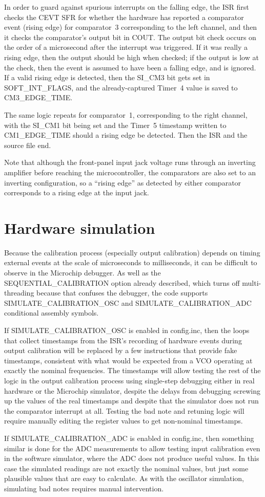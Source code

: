 In order to guard against spurious interrupts on the falling edge, the ISR
first checks the CEVT SFR for whether the hardware has reported a comparator
event (rising edge) for comparator~3 corresponding to the left channel, and
then it checks the comparator's output bit in COUT.  The output bit
check occurs on the order of a microsecond after the interrupt was
triggered.  If it was really a rising edge, then the output should be high
when checked; if the output is low at the check, then the event is assumed
to have been a falling edge, and is ignored.  If a valid rising edge is
detected, then the SI\_CM3 bit gets set in SOFT\_INT\_FLAGS, and the
already-captured Timer~4 value is saved to CM3\_EDGE\_TIME.

The same logic repeats for comparator~1, corresponding to the right channel,
with the SI\_CM1 bit being set and the Timer~5 timestamp written to
CM1\_EDGE\_TIME should a rising edge be detected.  Then the ISR and the
source file end.

Note that although the front-panel input jack voltage runs through an
inverting amplifier before reaching the microcontroller, the comparators are
also set to an inverting configuration, so a ``rising edge'' as detected by
either comparator corresponds to a rising edge at the input jack.

\section{Hardware simulation}

Because the calibration process (especially output calibration) depends on
timing external events at the scale of microseconds to milliseconds, it can
be difficult to observe in the Microchip debugger.  As well as the
SEQUENTIAL\_CALIBRATION option already described, which turns off
multi-threading because that confuses the debugger, the code supports
SIMULATE\_CALIBRATION\_OSC and SIMULATE\_CALIBRATION\_ADC 
conditional assembly symbols.

If SIMULATE\_CALIBRATION\_OSC is enabled in config.inc, then the loops that
collect timestamps from the ISR's recording of hardware events during output
calibration will be replaced by a few instructions that provide fake
timestamps, consistent with what would be expected from a VCO operating at
exactly the nominal frequencies.  The timestamps will allow testing the rest
of the logic in the output calibration process using single-step debugging
either in real hardware or the Microchip simulator, despite the delays from
debugging screwing up the values of the real timestamps and despite that the
simulator does not run the comparator interrupt at all.  Testing the bad
note and retuning logic will require manually editing the register values to
get non-nominal timestamps.

If SIMULATE\_CALIBRATION\_ADC is enabled in config.inc, then something
similar is done for the ADC measurements to allow testing input calibration
even in the software simulator, where the ADC does not produce useful
values.  In this case the simulated readings are not exactly the nominal
values, but just some plausible values that are easy to calculate.  As with
the oscillator simulation, simulating bad notes requires manual
intervention.
